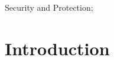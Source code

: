 \documentclass{sig-alternate}
\newcommand{\dan}[1]{\textcolor{blue}{{\it [Dan says: #1]}}}
\newcommand{\andy}[1]{\textcolor{blue}{{\it [Andy says: #1]}}}
\begin{document}
\begin{abstract}








\end{abstract}



Security and Protection;




\section{Introduction}

\end{document}
